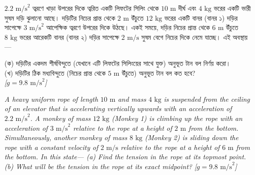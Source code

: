 \documentclass[12pt, a4paper]{article}
\begin{document}
\begin{tcolorbox}[questionbox={প্রশ্ন (Question) 5}]
\noindent
$2.2\text{ m/s}^2$ ত্বরণে খাড়া উপরের দিকে ত্বরিত একটি লিফটের সিলিং থেকে $10\text{ m}$ দীর্ঘ এবং $4\text{ kg}$ ভরের একটি ভারী সুষম দড়ি ঝুলানো আছে। দড়িটির নিচের প্রান্ত থেকে $2\text{ m}$ উঁচুতে $12\text{ kg}$ ভরের একটি বানর (বানর ১) দড়ির সাপেক্ষে $3\text{ m/s}^2$ আপেক্ষিক ত্বরণে উপরের দিকে উঠছে। একই সময়ে, দড়ির নিচের প্রান্ত থেকে $6\text{ m}$ উঁচুতে $8\text{ kg}$ ভরের আরেকটি বানর (বানর ২) দড়ির সাপেক্ষে $2\text{ m/s}$ সুষম বেগে নিচের দিকে নেমে যাচ্ছে। এই অবস্থায়— 

\vspace{0.3em}
\noindent
(ক) দড়িটির একদম শীর্ষবিন্দুতে (যেখানে এটি লিফটের সিলিংয়ের সাথে যুক্ত) অনুভূত টান বল নির্ণয় করো। \\
(খ) দড়িটির ঠিক মধ্যবিন্দুতে (নিচের প্রান্ত থেকে $5\text{ m}$ উঁচুতে) অনুভূত টান বল কত হবে? \\
\textit{[$g = 9.8\text{ m/s}^2$]}

\vspace{0.8em}
\begin{english}
\noindent\textit{\color{darkgray}
A heavy uniform rope of length $10\text{ m}$ and mass $4\text{ kg}$ is suspended from the ceiling of an elevator that is accelerating vertically upwards with an acceleration of $2.2\text{ m/s}^2$. A monkey of mass $12\text{ kg}$ (Monkey 1) is climbing up the rope with an acceleration of $3\text{ m/s}^2$ relative to the rope at a height of $2\text{ m}$ from the bottom. Simultaneously, another monkey of mass $8\text{ kg}$ (Monkey 2) is sliding down the rope with a constant velocity of $2\text{ m/s}$ relative to the rope at a height of $6\text{ m}$ from the bottom. In this state— (a) Find the tension in the rope at its topmost point. (b) What will be the tension in the rope at its exact midpoint? [$g = 9.8\text{ m/s}^2$]
}
\end{english}
\end{tcolorbox}
\end{document}
